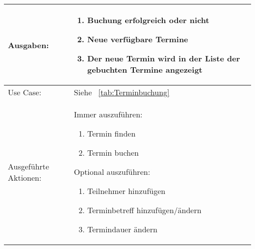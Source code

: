 \begin{tabularx}{\textwidth}{|X|X|}
    \hline
    Ausgaben: & \begin{enumerate}
                    \item Buchung erfolgreich oder nicht
                    \item Neue verfügbare Termine
                    \item Der neue Termin wird in der Liste der gebuchten Termine angezeigt
    \end{enumerate}\\
    \hline
    Use Case: & Siehe ~\ref{tab:Terminbuchung}\\
    \hline
    Ausgeführte Aktionen: & Immer auszuführen: \begin{enumerate}
                                                     \item Termin finden
                                                   \item Termin buchen
                                            \end{enumerate}
            \linebreak Optional auszuführen: \begin{enumerate}
                                      \item Teilnehmer hinzufügen
                                      \item Terminbetreff hinzufügen/ändern
                                        \item Termindauer ändern
                                      \end{enumerate}\\
    \hline
\end{tabularx}
\normalsize
\pagebreak